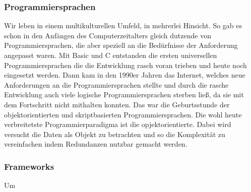 \subsubsection{Programmiersprachen}
Wir leben in einem multikulturellen Umfeld, in mehrerlei Hinsicht.
So gab es schon in den Anfängen des Computerzeitalters gleich dutzende 
von Programmiersprachen, die aber speziell an die Bedürfnisse der Anforderung
angepasst waren. Mit Basic und C entstanden die ersten universellen
Programmiersprachen die die Entwicklung rasch voran trieben und heute 
noch eingesetzt werden.
Dann kam in den 1990er Jahren das Internet, welches neue Anforderungen
an die Programmiersprachen stellte und durch die rasche Entwicklung auch 
viele logische Programmiersprachen sterben ließ, da sie mit dem Fortschritt 
nicht mithalten konnten.   
Das war die Geburtsstunde der objektorientierten und skriptbasierten 
Programmiersprachen.
Die wohl heute verbreitetste Programmierparadigma ist die opjektorientierte.
Dabei wird versucht die Daten als Objekt zu betrachten und so die 
Komplexität zu vereinfachen indem Redundanzen nutzbar gemacht werden.

\subsubsection{Frameworks} 
Um 
  

 
